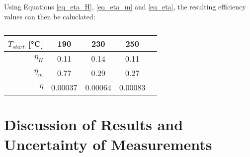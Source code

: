 \documentclass[titlepage]{article}
\begin{document}
Using Equations \ref{eq_eta_H}, \ref{eq_eta_m} and \ref{eq_eta}, the resulting efficiency values can then be caluclated:

\begin{table}[H]
    \centering
    \caption{}
    \label{tb_efficiency_values}
    \begin{tabular}{|r||c|c|c|c|}
        \hline
        \(T_{start}\) [°C] & \textbf{190} & \textbf{230} & \textbf{250}
        \\
        \hline
        \hline
        \(\eta_H\) & 0.11 & 0.14 & 0.11
        \\
        \hline
        \(\eta_m\) & 0.77 & 0.29 & 0.27
        \\
        \hline
        \(\eta\) & 0.00037 & 0.00064 & 0.00083
        \\
        \hline
    \end{tabular}
\end{table}

\newpage
\section{Discussion of Results and Uncertainty of Measurements}

\end{document}
